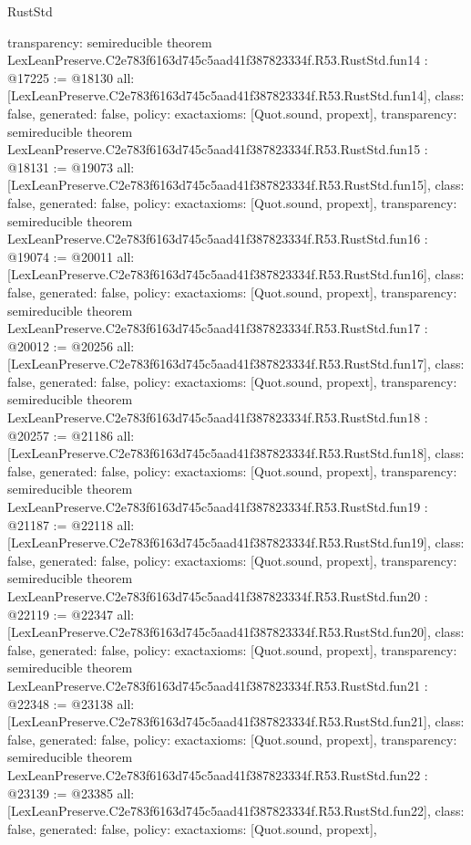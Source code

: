 \begin{lexlean}{RustStd}
\begin{coremodule}
{  transparency: semireducible
}
theorem LexLeanPreserve.C2e783f6163d745c5aad41f387823334f.R53.RustStd.fun14 : @17225 := @18130 {
  all: [LexLeanPreserve.C2e783f6163d745c5aad41f387823334f.R53.RustStd.fun14],
  class: false,
  generated: false,
  policy: exact{axioms: [Quot.sound, propext]},
  transparency: semireducible
}
theorem LexLeanPreserve.C2e783f6163d745c5aad41f387823334f.R53.RustStd.fun15 : @18131 := @19073 {
  all: [LexLeanPreserve.C2e783f6163d745c5aad41f387823334f.R53.RustStd.fun15],
  class: false,
  generated: false,
  policy: exact{axioms: [Quot.sound, propext]},
  transparency: semireducible
}
theorem LexLeanPreserve.C2e783f6163d745c5aad41f387823334f.R53.RustStd.fun16 : @19074 := @20011 {
  all: [LexLeanPreserve.C2e783f6163d745c5aad41f387823334f.R53.RustStd.fun16],
  class: false,
  generated: false,
  policy: exact{axioms: [Quot.sound, propext]},
  transparency: semireducible
}
theorem LexLeanPreserve.C2e783f6163d745c5aad41f387823334f.R53.RustStd.fun17 : @20012 := @20256 {
  all: [LexLeanPreserve.C2e783f6163d745c5aad41f387823334f.R53.RustStd.fun17],
  class: false,
  generated: false,
  policy: exact{axioms: [Quot.sound, propext]},
  transparency: semireducible
}
theorem LexLeanPreserve.C2e783f6163d745c5aad41f387823334f.R53.RustStd.fun18 : @20257 := @21186 {
  all: [LexLeanPreserve.C2e783f6163d745c5aad41f387823334f.R53.RustStd.fun18],
  class: false,
  generated: false,
  policy: exact{axioms: [Quot.sound, propext]},
  transparency: semireducible
}
theorem LexLeanPreserve.C2e783f6163d745c5aad41f387823334f.R53.RustStd.fun19 : @21187 := @22118 {
  all: [LexLeanPreserve.C2e783f6163d745c5aad41f387823334f.R53.RustStd.fun19],
  class: false,
  generated: false,
  policy: exact{axioms: [Quot.sound, propext]},
  transparency: semireducible
}
theorem LexLeanPreserve.C2e783f6163d745c5aad41f387823334f.R53.RustStd.fun20 : @22119 := @22347 {
  all: [LexLeanPreserve.C2e783f6163d745c5aad41f387823334f.R53.RustStd.fun20],
  class: false,
  generated: false,
  policy: exact{axioms: [Quot.sound, propext]},
  transparency: semireducible
}
theorem LexLeanPreserve.C2e783f6163d745c5aad41f387823334f.R53.RustStd.fun21 : @22348 := @23138 {
  all: [LexLeanPreserve.C2e783f6163d745c5aad41f387823334f.R53.RustStd.fun21],
  class: false,
  generated: false,
  policy: exact{axioms: [Quot.sound, propext]},
  transparency: semireducible
}
theorem LexLeanPreserve.C2e783f6163d745c5aad41f387823334f.R53.RustStd.fun22 : @23139 := @23385 {
  all: [LexLeanPreserve.C2e783f6163d745c5aad41f387823334f.R53.RustStd.fun22],
  class: false,
  generated: false,
  policy: exact{axioms: [Quot.sound, propext]},
}
\end{coremodule}
\end{lexlean}
